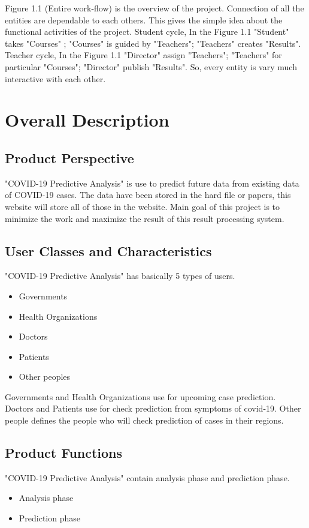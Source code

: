 \documentclass{scrreprt}
\begin{document}
\newline
Figure 1.1 (Entire work-flow) is the overview of the project. Connection of all the entities are dependable to each others.  This gives the simple idea about the functional activities of the project. 
\newline
Student cycle, In the Figure 1.1 "Student" takes "Courses" ; "Courses" is guided by "Teachers"; "Teachers" creates "Results". 
\newline
Teacher cycle, In the Figure 1.1 "Director" assign "Teachers"; "Teachers" for particular "Courses"; "Director" publish "Results".
\newline
So, every entity is vary much interactive with each other.


\chapter{Overall Description}

\section{Product Perspective}
"COVID-19 Predictive Analysis" is use to predict future data from existing data of COVID-19 cases. The data have been stored in the hard file or papers, this website will store all of those in the website. Main goal of this project is to minimize the work and maximize the result of this result processing system.

\section{User Classes and Characteristics}
"COVID-19 Predictive Analysis" has basically 5 types of users. 
\begin{itemize}
\item Governments
\item Health Organizations
  \item Doctors
  \item Patients
  \item Other peoples
\end{itemize}
Governments and Health Organizations use for upcoming case prediction.
Doctors and Patients use for check prediction from symptoms of covid-19.   
Other people defines the people who will check prediction of cases in their regions. 

\section{Product Functions}
"COVID-19 Predictive Analysis" contain analysis phase and prediction phase.
\begin{itemize}
\item  Analysis phase
\item Prediction phase
\end{itemize}
\end{document}
